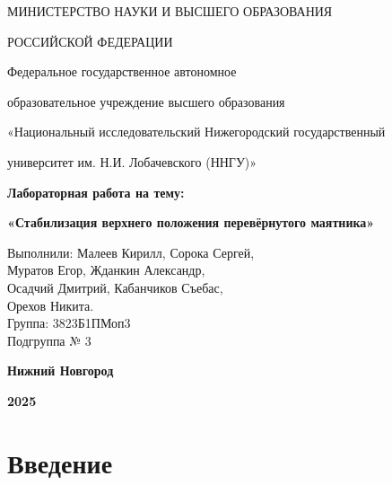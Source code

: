 \documentclass[12pt]{article}
\begin{document}
\thispagestyle{empty} %
\begin{center}
МИНИСТЕРСТВО НАУКИ И ВЫСШЕГО ОБРАЗОВАНИЯ

РОССИЙСКОЙ ФЕДЕРАЦИИ

\vspace{1cm}

Федеральное государственное автономное

образовательное учреждение высшего образования

«Национальный исследовательский Нижегородский государственный

университет им. Н.И. Лобачевского (ННГУ)»

\vspace{4cm}

\textbf{Лабораторная работа на тему:}

\vspace{0.5cm}

\textbf{«Стабилизация верхнего положения перевёрнутого
маятника»}

\vspace{3cm}

\begin{flushright}
\small
Выполнили: Малеев Кирилл, Сорока Сергей, \\
Муратов Егор, Жданкин Александр, \\
Осадчий Дмитрий, Кабанчиков Съебас, \\
Орехов Никита.\\
Группа: 3823Б1ПМоп3 \\
Подгруппа № 3
\end{flushright}

\vspace{7cm}

\textbf{\large Нижний Новгород}

\textbf{\large 2025}
\end{center}

\pagestyle{plain} %

\newpage

\renewcommand{\contentsname}{СОДЕРЖАНИЕ:}

\tableofcontents

\newpage

\section{Введение}
\end{document}
